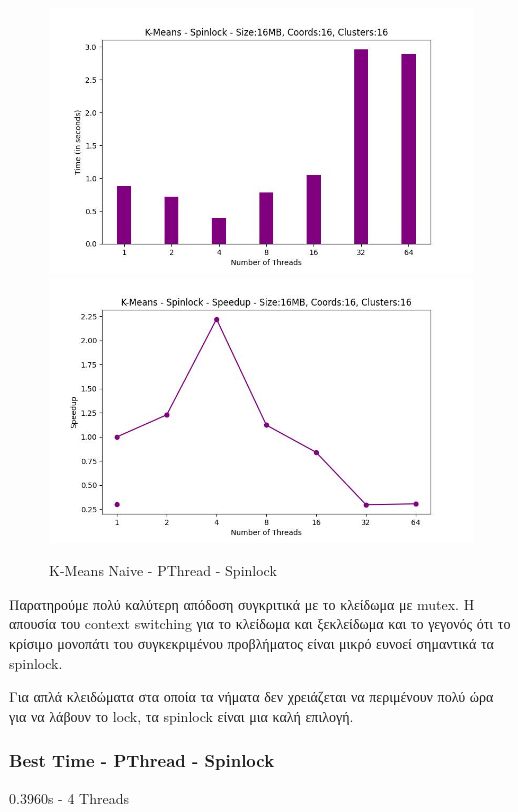 \documentclass[letterpaper,12pt]{article}
\begin{document}
\begin{figure}[H]
    \centering
        \includegraphics[scale=0.4]{outFilesAffinityMouliko/plots/kmeans_locks_pthread_spin.jpg}
        \includegraphics[scale=0.4]{outFilesAffinityMouliko/plots/kmeans_locks_pthread_spin_speedup.jpg}
    \caption{K-Means Naive - PThread - Spinlock}
    \label{fig:K-Means Naive - PThread - Spinlock}
\end{figure}

Παρατηρούμε πολύ καλύτερη απόδοση συγκριτικά με το κλείδωμα με mutex. Η απουσία του context switching για το κλείδωμα και ξεκλείδωμα και 
το γεγονός ότι το κρίσιμο μονοπάτι του συγκεκριμένου προβλήματος είναι μικρό ευνοεί σημαντικά τα spinlock.

Για απλά κλειδώματα στα οποία τα νήματα δεν χρειάζεται να περιμένουν πολύ ώρα για να λάβουν το lock, τα spinlock
είναι μια καλή επιλογή.

\subsubsection*{Best Time - PThread - Spinlock}
0.3960s - 4 Threads
\end{document}
